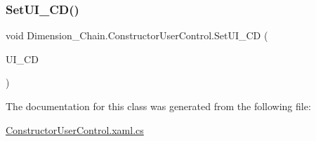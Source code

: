 \subsubsection{\texorpdfstring{Set\+U\+I\+\_\+\+C\+D()}{SetUI\_CD()}}
{\footnotesize\ttfamily void Dimension\+\_\+\+Chain.\+Constructor\+User\+Control.\+Set\+U\+I\+\_\+\+CD (\begin{DoxyParamCaption}\item[{\mbox{\hyperlink{class_dimension___chain_1_1_u_i___constr_dimension}{U\+I\+\_\+\+Constr\+Dimension}}}]{U\+I\+\_\+\+CD }\end{DoxyParamCaption})}



The documentation for this class was generated from the following file\+:\begin{DoxyCompactItemize}
\item 
\mbox{\hyperlink{_constructor_user_control_8xaml_8cs}{Constructor\+User\+Control.\+xaml.\+cs}}\end{DoxyCompactItemize}
